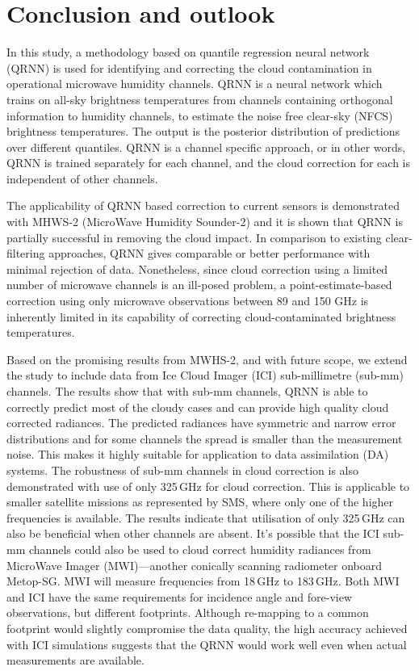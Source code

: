 \documentclass[amt, manuscript]{copernicus}
\begin{document}
\section{Conclusion and outlook}  
\label{conclusions}
%

In this study, a methodology based on quantile regression neural network (QRNN) is used for identifying and correcting the cloud contamination in operational microwave humidity channels. QRNN is a neural network which trains on all-sky brightness temperatures from channels containing orthogonal information to humidity channels, to estimate the noise free clear-sky (NFCS) brightness temperatures. The output is the posterior distribution of predictions over different quantiles. QRNN is a channel specific approach, or in other words, QRNN is trained separately for each channel, and the cloud correction for each is independent of other channels. 

The applicability of QRNN based correction to current sensors is demonstrated with MHWS-2 (MicroWave Humidity Sounder-2) and it is shown that QRNN is partially successful in removing the cloud impact. In comparison to existing clear-filtering approaches, QRNN gives comparable or better performance with minimal rejection of data. Nonetheless, since cloud correction
using a limited number of microwave channels is an ill-posed problem, a point-estimate-based correction using only microwave observations between 89 and 150 GHz is inherently limited in its capability of correcting cloud-contaminated brightness temperatures. 

Based on the promising results from MWHS-2, and with future scope, we extend the study to include data from Ice Cloud Imager (ICI) sub-millimetre (sub-mm) channels. The results show that with  sub-mm channels, QRNN is able to correctly predict most of the cloudy cases and can provide high quality cloud corrected radiances. The predicted radiances have symmetric and narrow error distributions and for some channels the spread is smaller than the measurement noise. This makes it highly suitable for application to data assimilation (DA) systems. The robustness of sub-mm channels in cloud correction is also demonstrated with use of only 325\,GHz for cloud correction. This is applicable to smaller satellite missions as represented by SMS, where only one of the higher frequencies is available. The results indicate that utilisation of only 325\,GHz can also be beneficial when other channels are absent. It's possible that the ICI sub-mm channels could also be used to cloud correct humidity radiances from MicroWave Imager (MWI)---another conically scanning radiometer onboard Metop-SG. MWI will measure frequencies from 18\,GHz to 183\,GHz. Both MWI and ICI have the same requirements for incidence angle and fore-view observations, but different footprints. Although re-mapping to a common footprint  would slightly compromise the data quality, the high accuracy achieved with ICI simulations suggests that the QRNN would work well even when actual measurements are available.
\end{document}

